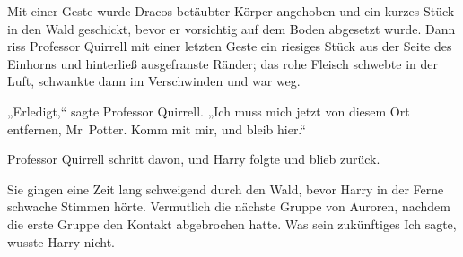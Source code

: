 Mit einer Geste wurde Dracos betäubter Körper angehoben und ein kurzes Stück in den Wald geschickt, bevor er vorsichtig auf dem Boden abgesetzt wurde. Dann riss Professor Quirrell mit einer letzten Geste ein riesiges Stück aus der Seite des Einhorns und hinterließ ausgefranste Ränder; das rohe Fleisch schwebte in der Luft, schwankte dann im Verschwinden und war weg.

„Erledigt,“ sagte Professor Quirrell. „Ich muss mich jetzt von diesem Ort entfernen, Mr~Potter. Komm mit mir, und bleib hier.“

Professor Quirrell schritt davon, und Harry folgte und blieb zurück.

Sie gingen eine Zeit lang schweigend durch den Wald, bevor Harry in der Ferne schwache Stimmen hörte. Vermutlich die nächste Gruppe von Auroren, nachdem die erste Gruppe den Kontakt abgebrochen hatte. Was sein zukünftiges Ich sagte, wusste Harry nicht.

